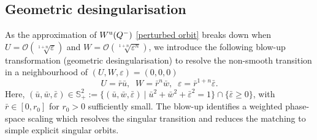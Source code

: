 \documentclass{article}
\theoremstyle{definition}
\numberwithin{equation}{section}
\begin{document}
\subsection{Geometric desingularisation}
As the approximation of $W^{\rm u}(Q^-)$ \eqref{perturbed orbit} breaks down when $U=\mathcal{O}(\sqrt[1+n]{\varepsilon})$ and $W=\mathcal{O}(\sqrt[1+n]{\varepsilon^n})$, we introduce the following blow-up transformation (geometric desingularisation) to resolve the non-smooth transition in a neighbourhood of $(U,W,\varepsilon)=(0,0,0)$
\begin{equation}
    U=\bar{r}\bar{u}, \;\; W=\bar{r}^n\bar{w},\;\; \varepsilon=\bar{r}^{1+n}\bar{\varepsilon}.
    \label{blow-up}
\end{equation}
Here, $(\bar{u}, \bar{w},  \bar{\varepsilon})\in \mathbb{S}_+^2:=\{(\bar{u},\bar{w}, \bar{\varepsilon})\:|\; \bar{u}^2+\bar{w}^2+\bar{\varepsilon}^2=1\}\cap\{\bar{\varepsilon}\geq 0\}$, with $\bar{r}\in[0, r_0]$ for $r_0>0$ sufficiently small.
The blow-up identifies a weighted phase-space scaling which resolves the singular transition and reduces the matching to simple explicit singular orbits. 
\end{document}
